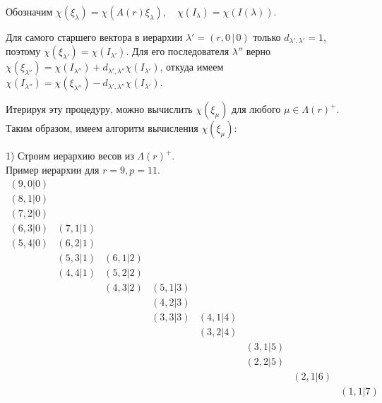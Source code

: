 Обозначим $ \chi(\xi_{\lambda}) = \chi (A(r)\xi_{\lambda}), \quad \chi(I_{\lambda}) = \chi (I(\lambda)) $.

Для самого старшего вектора в иерархии $ \lambda' = (r, 0 \,|\, 0) $ только $ d_{\lambda', \lambda'} = 1 $, поэтому
$ \chi(\xi_{\lambda'}) = \chi(I_{\lambda'}) $. Для его последователя $ \lambda'' $ верно 
$ \chi(\xi_{\lambda''}) = \chi(I_{\lambda''}) + d_{\lambda', \lambda''} \chi(I_{\lambda'}) $, откуда имеем
$ \chi(I_{\lambda''}) = \chi(\xi_{\lambda''}) - d_{\lambda', \lambda''} \chi(I_{\lambda'}) $.

Итерируя эту процедуру, можно вычислить $ \chi(\xi_{\mu}) $ для любого $\mu \in \Lambda(r)^+ $.
Таким образом, имеем алгоритм вычисления $ \chi(\xi_{\mu}) $:

1) Строим иерархию весов из $ \Lambda(r)^+ $.
\\
Пример иерархии для $ r = 9, p = 11 $.
$$
\begin{matrix}
(9, 0 | 0) &            &            &            &            &            &            &            \\
(8, 1 | 0) &            &            &            &            &            &            &            \\
(7, 2 | 0) &            &            &            &            &            &            &            \\
(6, 3 | 0) & (7, 1 | 1) &            &            &            &            &            &            \\
(5, 4 | 0) & (6, 2 | 1) &            &            &            &            &            &            \\   
           & (5, 3 | 1) & (6, 1 | 2) &            &            &            &            &            \\  
           & (4, 4 | 1) & (5, 2 | 2) &            &            &            &            &            \\  
           &            & (4, 3 | 2) & (5, 1 | 3) &            &            &            &            \\ 
           &            &            & (4, 2 | 3) &            &            &            &            \\ 
           &            &            & (3, 3 | 3) & (4, 1 | 4) &            &            &            \\
           &            &            &            & (3, 2 | 4) &            &            &            \\ 
           &            &            &            &            & (3, 1 | 5) &            &            \\
           &            &            &            &            & (2, 2 | 5) &            &            \\
           &            &            &            &            &            & (2, 1 | 6) &            \\ 
           &            &            &            &            &            &            & (1, 1 | 7) \\ 
\end{matrix}
$$
